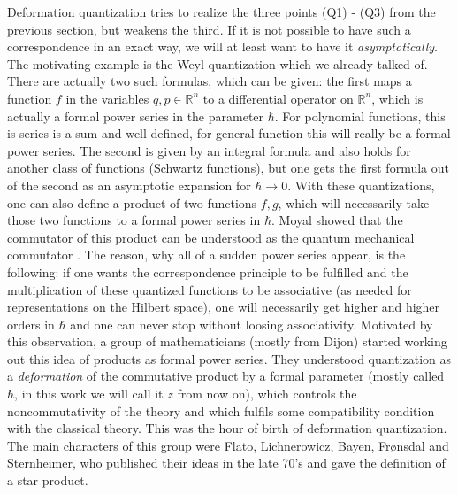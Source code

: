 Deformation quantization tries to realize the three points (Q1) - (Q3) from the 
previous section, but weakens the third. If it is not possible to have such a 
correspondence in an exact way, we will at least want to have it 
\emph{asymptotically}. The motivating example is the Weyl quantization which we 
already talked of. There are actually two such formulas, which can be given: the 
first maps a function $f$ in the variables $q, p \in \mathbb{R}^n$ to a 
differential operator on $\mathbb{R}^n$, which is actually a formal power series 
in the parameter $\hbar$. For polynomial functions, this is series is a sum and 
well defined, for general function this will really be a formal power series. 
The second is given by an integral formula and also holds for another class of 
functions (Schwartz functions), but one gets the first formula out of the second 
as an asymptotic expansion for $\hbar \longrightarrow 0$. With these 
quantizations, one can also define a product of two functions $f, g$, which will 
necessarily take those two functions to a formal power series in $\hbar$. Moyal 
showed that the commutator of this product can be understood as the quantum 
mechanical commutator \cite{moyal:1949a}. The reason, why all of a sudden power 
series appear, is the following: if one wants the correspondence principle to be 
fulfilled and the multiplication of these quantized functions to be associative 
(as needed for representations on the Hilbert space), one will necessarily get 
higher and higher orders in $\hbar$ and one can never stop without loosing 
associativity. Motivated by this observation, a group of mathematicians (mostly 
from Dijon) started working out this idea of products as formal power series. 
They understood quantization as a \emph{deformation} of the commutative product 
by a formal parameter (mostly called $\hbar$, in this work we will call it $z$ 
from now on), which controls the noncommutativity of the theory and which 
fulfils some compatibility condition with the classical theory. This was the 
hour of birth of deformation quantization. The main characters of this group 
were Flato, Lichnerowicz, Bayen, Fr{\o}nsdal and Sternheimer, who published 
their ideas in the late 70's \cite{bayen.et.al:1977a, bayen.et.al:1978a} and 
gave the definition of a star product.
